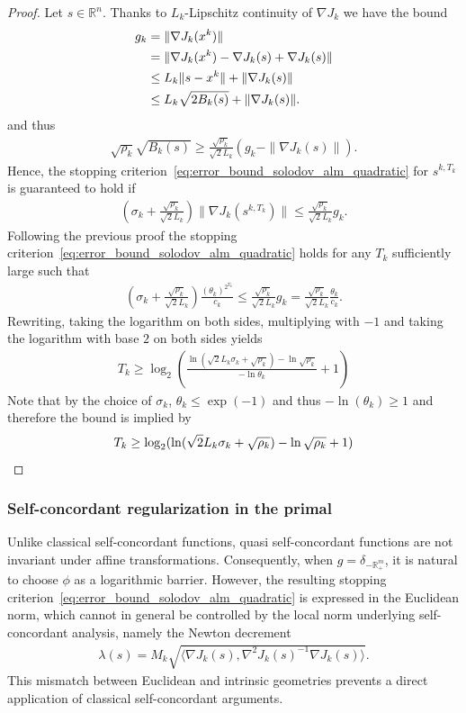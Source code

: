 \documentclass[11pt,onecolumn]{article}
\newcommand{\bR}{\mathbb{R}}
\theoremstyle{remark}
\begin{document}
\begin{proof}
Let $s \in \bR^n$. Thanks to $L_k$-Lipschitz continuity of $\nabla J_k$ we have the bound
\begin{align}
g_k &= \|\nabla J_k(x^k)\| \notag\\
&= \|\nabla J_k(x^k) - \nabla J_k(s) + \nabla J_k(s)\| \notag\\
&\leq L_k \|s-x^k\| + \|\nabla J_k(s)\| \notag\\
&\leq L_k \sqrt{2 B_k(s)} +  \|\nabla J_k(s)\|.
\end{align}
and thus
\begin{align}
\sqrt{\rho_k} \sqrt{B_k(s)} \geq \tfrac{\sqrt{\rho_k}}{\sqrt{2} L_k} (g_k -\|\nabla J_k(s)\|).
\end{align}
Hence, the stopping criterion~\cref{eq:error_bound_solodov_alm_quadratic} for $s^{k,T_k}$ is guaranteed to hold if
\begin{align}
(\sigma_k + \tfrac{\sqrt{\rho_k}}{\sqrt{2}L_k}) \|\nabla J_k(s^{k,T_k })\|  \leq \tfrac{\sqrt{\rho_k}}{\sqrt{2} L_k} g_k.
\end{align}
Following the previous proof the stopping criterion~\cref{eq:error_bound_solodov_alm_quadratic} holds for any $T_k$ sufficiently large such that
\begin{align}
     (\sigma_k + \tfrac{\sqrt{\rho_k}}{\sqrt{2}L_k}) \frac{(\theta_k)^{2^{T_k}}}{c_k} \leq \frac{\sqrt{\rho_k}}{\sqrt{2}L_k} g_k = \frac{\sqrt{\rho_k}}{\sqrt{2}L_k} \frac{\theta_k}{c_k}.
\end{align}
Rewriting, taking the logarithm on both sides, multiplying with $-1$ and taking the logarithm with base $2$ on both sides yields
\begin{align}
     T_k  \geq \log_2 \left(\frac{\ln (\sqrt{2}L_k \sigma_k + \sqrt{\rho_k} ) - \ln \sqrt{\rho_k}}{-\ln \theta_k} + 1 \right)
\end{align}
Note that by the choice of $\sigma_k$, $\theta_k\leq \exp(-1)$ and thus $-\ln(\theta_k) \geq 1$ and therefore the bound is implied by
\[
T_k  \geq \log_2 (\ln (\sqrt{2}L_k \sigma_k + \sqrt{\rho_k} ) - \ln \sqrt{\rho_k} + 1) \qedhere
\]
\end{proof}

\subsubsection{Self-concordant regularization in the primal}
Unlike classical self-concordant functions, quasi self-concordant functions are not invariant under affine transformations. Consequently, when $g=\delta_{-\bR^m_+}$, it is natural to choose $\phi$ as a logarithmic barrier. However, the resulting stopping criterion~\cref{eq:error_bound_solodov_alm_quadratic} is expressed in the Euclidean norm, which cannot in general be controlled by the local norm underlying self-concordant analysis, namely the Newton decrement \begin{align}
\lambda(s)= M_k \sqrt{\langle \nabla J_k(s), \nabla^2 J_k(s)^{-1} \nabla J_k(s)\rangle}.
\end{align}
This mismatch between Euclidean and intrinsic geometries prevents a direct application of classical self-concordant arguments.
\end{document}
